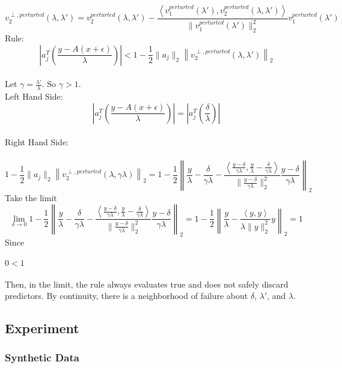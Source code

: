 \documentclass{article}
\begin{document}
$$
v_2^{\perp,perturted}(\lambda,\lambda') = v_2^{perturted}(\lambda,\lambda') - \frac{\left<v_1^{perturted}(\lambda'),v_2^{perturted}(\lambda,\lambda')\right>}{\|v_1^{perturted}(\lambda')\|^2_2} v_1^{perturted}(\lambda')
$$
Rule:
$$
\left|a_j^T \left(\frac{y - A(x+\epsilon)}{\lambda}\right)\right| < 1 - \frac 12 \|a_j\|_2 \left\| v_2^{\perp,perturted}(\lambda,\lambda') \right\|_2
$$
\\
Let $\gamma = \frac {\lambda'}{\lambda}$. So $\gamma>1$.\\
Left Hand Side:
$$
\left|a_j^T \left(\frac{y - A(x+\epsilon)}{\lambda}\right)\right| = \left|a_j^T \left(\frac{\delta}{\lambda}\right)\right| 
$$
\\
Right Hand Side: \\
\\
$$
1 - \frac 12 \|a_j\|_2 \left\| v_2^{\perp,perturted}(\lambda,\gamma\lambda) \right\|_2 
= 1 - \frac 12 \left\| \frac y\lambda - \frac {\delta}{\gamma\lambda} - \frac {\left<\frac{y-\delta}{\gamma\lambda},\frac{y}{\lambda}-\frac{\delta}{\gamma\lambda}\right>}{\|\frac{y-\delta}{\gamma\lambda}\|_2^2}  \frac{y-\delta}{\gamma\lambda}  \right\|_2
$$
Take the limit
$$
\lim_{\delta\rightarrow 0} 1 - \frac 12 \left\| \frac y\lambda - \frac {\delta}{\gamma\lambda} - \frac {\left<\frac{y-\delta}{\gamma\lambda},\frac{y}{\lambda}-\frac{\delta}{\gamma\lambda}\right>}{\|\frac{y-\delta}{\gamma\lambda}\|_2^2}  \frac{y-\delta}{\gamma\lambda}  \right\|_2 
= 1 - \frac 12 \left\| \frac y\lambda - \frac {\left<y,y\right>}{\lambda\|y\|_2^2}  y  \right\|_2=1
$$
Since\\
\\
$0<1$\\
\\
Then, in the limit, the rule always evaluates true and does not safely discard predictors. By continuity, there is a neighborhood of failure about $\delta$, $\lambda'$, and $\lambda$.

\subsection*{Experiment}

\subsubsection*{Synthetic Data}
\end{document}
